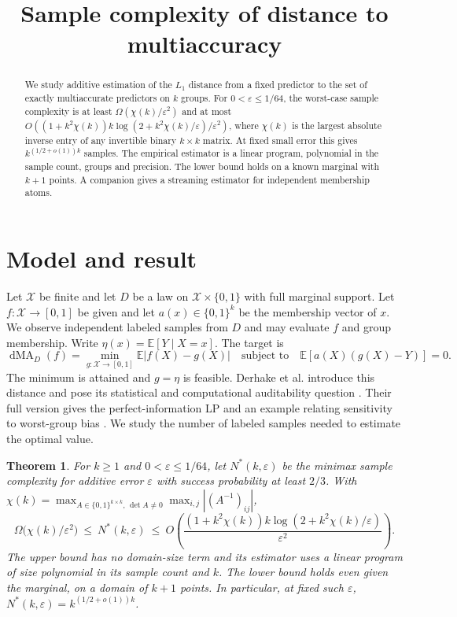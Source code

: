 \documentclass[11pt,a4paper]{amsart}
\title[Distance to multiaccuracy]{Sample complexity of distance to multiaccuracy}
\date{}
\newtheorem{theorem}{Theorem}
\newcommand{\E}{\mathbb E}
\newcommand{\dMA}{\operatorname{dMA}}
\begin{document}
\begin{abstract}
We study additive estimation of the $L_1$ distance from a fixed predictor to the set of exactly multiaccurate predictors on $k$ groups. For $0<\varepsilon\leq1/64$, the worst-case sample complexity is at least $\Omega(\chi(k)/\varepsilon^2)$ and at most $O((1+k^2\chi(k))k\log(2+k^2\chi(k)/\varepsilon)/\varepsilon^2)$, where $\chi(k)$ is the largest absolute inverse entry of any invertible binary $k\times k$ matrix. At fixed small error this gives $k^{(1/2+o(1))k}$ samples. The empirical estimator is a linear program, polynomial in the sample count, groups and precision. The lower bound holds on a known marginal with $k+1$ points. A companion gives a streaming estimator for independent membership atoms.
\end{abstract}
\maketitle

\section{Model and result}
Let $\mathcal X$ be finite and let $D$ be a law on $\mathcal X\times\{0,1\}$ with full marginal support. Let $f:\mathcal X\to[0,1]$ be given and let $a(x)\in\{0,1\}^k$ be the membership vector of $x$. We observe independent labeled samples from $D$ and may evaluate $f$ and group membership. Write $\eta(x)=\E[Y\mid X=x]$. The target is
\[
 \dMA_D(f)=\min_{g:\mathcal X\to[0,1]}\E|f(X)-g(X)|
       \quad\text{subject to}\quad \E[a(X)(g(X)-Y)]=0.
\]
The minimum is attained and $g=\eta$ is feasible. Derhake et al. introduce this distance and pose its statistical and computational auditability question \cite[\S1.2.6]{derhake}. Their full version gives the perfect-information LP and an example relating sensitivity to worst-group bias \cite[\S4]{derhakefull}. We study the number of labeled samples needed to estimate the optimal value.

\begin{theorem}\label{thm:sample}
For $k\geq1$ and $0<\varepsilon\leq1/64$, let $N^*(k,\varepsilon)$ be the minimax sample complexity for additive error $\varepsilon$ with success probability at least $2/3$. With $\chi(k)=\max_{A\in\{0,1\}^{k\times k},\,\det A\ne0}\max_{i,j}|(A^{-1})_{ij}|$,
\[
 \Omega\bigl(\chi(k)/\varepsilon^2\bigr)\ \leq\ N^*(k,\varepsilon)\ \leq\
 O\left(\frac{(1+k^2\chi(k))k\log(2+k^2\chi(k)/\varepsilon)}{\varepsilon^2}\right).
\]
The upper bound has no domain-size term and its estimator uses a linear program of size polynomial in its sample count and $k$. The lower bound holds even given the marginal, on a domain of $k+1$ points. In particular, at fixed such $\varepsilon$, $N^*(k,\varepsilon)=k^{(1/2+o(1))k}$.
\end{theorem}
\end{document}

